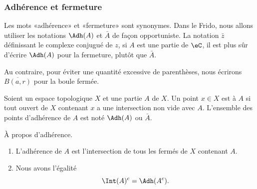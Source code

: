 \subsubsection{Adhérence et fermeture}

\begin{normaltext}
	Les mots «adhérence» et «fermeture» sont synonymes. Dans le Frido, nous allons utiliser les notations \( \Adh(A)\) et \( \bar A\) de façon opportuniste. La notation \( \bar z\) définissant le complexe conjugué de \( z\), si \( A\) est une partie de \( \eC\), il est plus sûr d'écrire \( \Adh(A)\) pour la fermeture, plutôt que \( \bar A\).

	Au contraire, pour éviter une quantité excessive de parenthèses, nous écrirons \( \overline{ B(a,r) }\) pour la boule fermée.
\end{normaltext}

\begin{definition}      \label{DEFooSVWMooLpAVZR}
	Soient un espace topologique \( X\) et une partie \( A\) de \( X\). Un point \( x\in X\) est  à \( A\) si tout ouvert de \( X\) contenant \( x\) a une intersection non vide avec \( A\). L'ensemble des points d'adhérence de \( A\) est noté \( \Adh(A)\) ou \( \bar A\).
\end{definition}

\begin{lemma}       \label{LEMooILNCooOFZaTe}
	À propos d'adhérence.
	\begin{enumerate}
		\item		\label{ITEMooEGDXooQVHyNBZ}
		      L'adhérence de \( A\) est l'intersection de tous les fermés de \( X\) contenant \( A\).
		\item
		      Nous avons l'égalité
		      \begin{equation}
			      \Int(A)^c = \Adh(A^c).
		      \end{equation}
	\end{enumerate}
\end{lemma}

